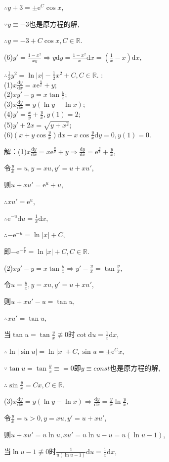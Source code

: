 \documentclass[12pt,UTF8]{ctexart}
\newcommand{\md}[1]{\mathrm d#1}
\newcommand{\me}[0]{\mathrm e}
\begin{document}
\begin{enumerate}
$\therefore y+3=\pm\me^C\cos x$,

$\because y\equiv-3$也是原方程的解,

$\therefore y=-3+C\cos x,C\in\mathbb R$.

(6)$y'=\frac{1-x^2}{xy}\Rightarrow y\mathrm dy=\frac{1-x^2}x\mathrm dx=(\frac1x-x)\mathrm dx$,

$\therefore\frac12y^2=\ln|x|-\frac12x^2+C,C\in\mathbb R$.
:\\
(1)$x\frac{\md y}{\md x}=x\me^{\frac yx}+y$;\\
(2)$xy'-y=x\tan\frac yx$;\\
(3)$x\frac{\md y}{\md x}=y(\ln y-\ln x)$;\\
(4)$y'=\frac xy+\frac yx,y(1)=2$;\\
(5)$y'+2x=\sqrt{y+x^2}$;\\
(6)$(x+y\cos\frac yx)\md x-x\cos\frac yx\md y=0,y(1)=0$.

解：(1)$x\frac{\md y}{\md x}=x\me^{\frac yx}+y\Rightarrow\frac{\md y}{\md x}=\me^{\frac yx}+\frac yx$,

令$\frac yx=u, y=xu,y'=u+xu'$,

则$u+xu'=\me^u+u$, 

$\therefore xu'=\me^u$,

$\therefore\me^{-u}\md u=\frac1x\md x$,

$\therefore-\me^{-u}=\ln|x|+C$,

即$-\me^{-\frac yx}=\ln|x|+C,C\in\mathbb R$.

(2)$xy'-y=x\tan\frac yx\Rightarrow y'-\frac yx=\tan\frac yx$,

令$u=\frac yx,y=xu,y'=u+xu'$,

则$u+xu'-u=\tan u$,

$\therefore xu'=\tan u$,

当$\tan u=\tan\frac yx\not\equiv0$时$\cot\md u=\frac1x\md x$,

$\therefore\ln|\sin u|=\ln|x|+C,\sin u=\pm\me^Cx$,

$\because\tan u=\tan\frac yx\equiv=0$即$y\equiv const$也是原方程的解,

$\therefore\sin\frac yx=Cx,C\in\mathbb R$.

(3)$x\frac{\md y}{\md x}=y(\ln y-\ln x)\Rightarrow\frac{\md y}{\md x}=\frac yx\ln\frac yx$,

令$\frac yx=u>0,y=xu,y'=u+xu'$,

则$u+xu'=u\ln u, xu'=u\ln u-u=u(\ln u-1)$,

当$\ln u-1\not\equiv0$时$\frac1{u(\ln u-1)}\md u=\frac1x\md x$,


\end{enumerate}
\end{document}
